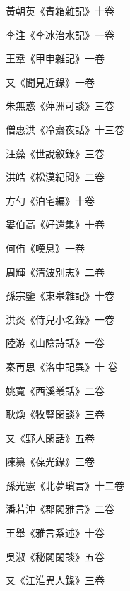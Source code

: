 \begin{pinyinscope}
 黃朝英《青箱雜記》十卷



 李注《李冰治水記》一卷



 王鞏《甲申雜記》一卷



 又《聞見近錄》一卷



 朱無惑《萍洲可談》三卷



 僧惠洪《冷齋夜話》十三卷



 汪藻《世說敘錄》三卷



 洪皓《松漠紀聞》二卷



 方勺《泊宅編》十卷



 婁伯高《好還集》十卷



 何侑《嘆息》一卷



 周輝《清波別志》二卷



 孫宗鑒《東皋雜記》十卷



 洪炎《侍兒小名錄》一卷



 陸游《山陰詩話》一卷



 秦再思《洛中記異》十
 卷



 姚寬《西溪叢話》二卷



 耿煥《牧豎閑談》三卷



 又《野人閑話》五卷



 陳纂《葆光錄》三卷



 孫光憲《北夢瑣言》十二卷



 潘若沖《郡閣雅言》二卷



 王舉《雅言系述》十卷



 吳淑《秘閣閑談》五卷



 又《江淮異人錄》三卷




\end{pinyinscope}
